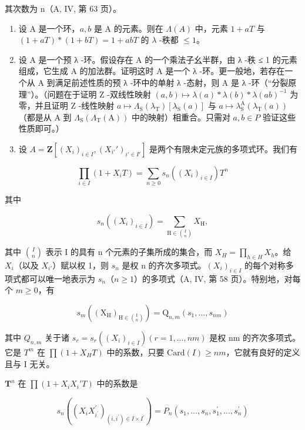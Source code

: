 其次数为 n（A, IV, 第 63 页）。

\begin{enumerate}
\def\labelenumi{\alph{enumi})}
\setcounter{enumi}{1}
\item
  设 A 是一个环，\(a, b\) 是 A 的元素。则在 \(\Lambda(A)\) 中，元素 \(1 + aT\) 与 \((1 + aT)*(1 + bT) = 1 + abT\) 的 \(\lambda\) -秩都 \(\leqslant 1\)。
\item
  设 A 是一个预 λ -环。假设存在 A 的一个乘法子幺半群，由 λ -秩 ≤ 1 的元素组成，它生成 A 的加法群。证明这时 A 是一个 λ -环。更一般地，若存在一个从 A 到满足前述性质的预 λ -环中的单射 λ -态射，则 A 是 λ -环（“分裂原理”）。（问题在于证明 Z -双线性映射 \((a, b) \mapsto \lambda(a) * \lambda(b) * \lambda(ab)^{-1}\) 为零，并且证明 Z -线性映射 \(a \mapsto \Lambda_{\mathrm{S}}(\lambda_{\mathrm{T}})[\lambda_{\mathrm{S}}(a)]\) 与 \(a \mapsto \lambda_{\mathrm{S}}^{\mathrm{A}}(\lambda_{\mathrm{T}}(a))\)（都是从 A 到 \(\Lambda_{\mathrm{S}}(\Lambda_{\mathrm{T}}(\mathrm{A}))\) 中的映射）相重合。只需对 \(a, b \in P\) 验证这些性质即可。）
\item
  设 \(A = \mathbf{Z}[(X_i)_{i\in I}, (X_{i'}')_{i'\in I'}]\) 是两个有限未定元族的多项式环。我们有
\end{enumerate}

\[
\prod_ {i \in I} (1 + X _ {i} T) = \sum_ {n \geqslant 0} s _ {n} ((X _ {i}) _ {i \in I}) T ^ {n}
\]

其中

\[
s _ {n} \left(\left(X _ {i}\right) _ {i \in I}\right) = \sum_ {\mathrm{H} \in \binom {I} {n}} X _ {\mathrm{H}},
\]

其中 \(\binom{I}{n}\) 表示 I 的具有 n 个元素的子集所成的集合，而 \(X_{H} = \prod_{h \in H} X_{h}\)。给 \(X_{i}\)（以及 \(X_{i'}\)）赋以权 1，则 \(s_{n}\) 是权 n 的齐次多项式。\((X_{i})_{i \in I}\) 的每个对称多项式都可以唯一地表示为 \(s_{n}\)（\(n \geqslant 1\)）的多项式（A, IV, 第 58 页）。特别地，对每个 \(m \geqslant 0\)，有

\[
s _ {m} \left(\left(\mathrm{X} _ {\mathrm{H}}\right) _ {\mathrm{H} \in \binom {\mathrm{I}} {n}}\right) = \mathrm{Q} _ {n, m} \left(s _ {1}, \dots , s _ {n m}\right)
\]

其中 \(Q_{n,m}\) 关于诸 \(s_r = s_r((X_i)_{i \in I}) (r = 1, \ldots, nm)\) 是权 nm 的齐次多项式。它是 \(T^m\) 在 \(\prod (1 + X_H T)\) 中的系数，只要 \(\text{Card}(I) \geqslant nm\)，它就有良好的定义且与 I 无关。

\(\mathbf{T}^n\) 在 \(\prod (1 + X_iX_i'T)\) 中的系数是

\[
s _ {n} \left(\left(X _ {i} X _ {i ^ {\prime}} ^ {\prime}\right) _ {(i, i ^ {\prime}) \in I \times I ^ {\prime}}\right) = P _ {n} \left(s _ {1}, \dots , s _ {n}, s _ {1} ^ {\prime}, \dots , s _ {n} ^ {\prime}\right)
\]

